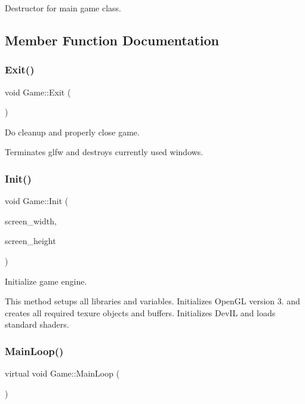 Destructor for main game class. 



\subsection{Member Function Documentation}
\mbox{\label{class_game_ad06e374518f2c8fa38279be6712a6ea4}} 
\subsubsection{\texorpdfstring{Exit()}{Exit()}}
{\footnotesize\ttfamily void Game\+::\+Exit (\begin{DoxyParamCaption}{ }\end{DoxyParamCaption})}



Do cleanup and properly close game. 

Terminates glfw and destroys currently used windows. \mbox{\label{class_game_a8f6f29e6c7f2e33801a942ebd227cf37}} 
\subsubsection{\texorpdfstring{Init()}{Init()}}
{\footnotesize\ttfamily void Game\+::\+Init (\begin{DoxyParamCaption}\item[{G\+Luint}]{screen\+\_\+width,  }\item[{G\+Luint}]{screen\+\_\+height }\end{DoxyParamCaption})}



Initialize game engine. 

This method setups all libraries and variables. Initializes Open\+GL version 3. and creates all required texure objects and buffers. Initializes Dev\+IL and loads standard shaders. \mbox{\label{class_game_a385a99545d3ddbce7893807939da63da}} 
\subsubsection{\texorpdfstring{MainLoop()}{MainLoop()}}
{\footnotesize\ttfamily virtual void Game\+::\+Main\+Loop (\begin{DoxyParamCaption}{ }\end{DoxyParamCaption})\hspace{0.3cm}{\ttfamily [pure virtual]}}



